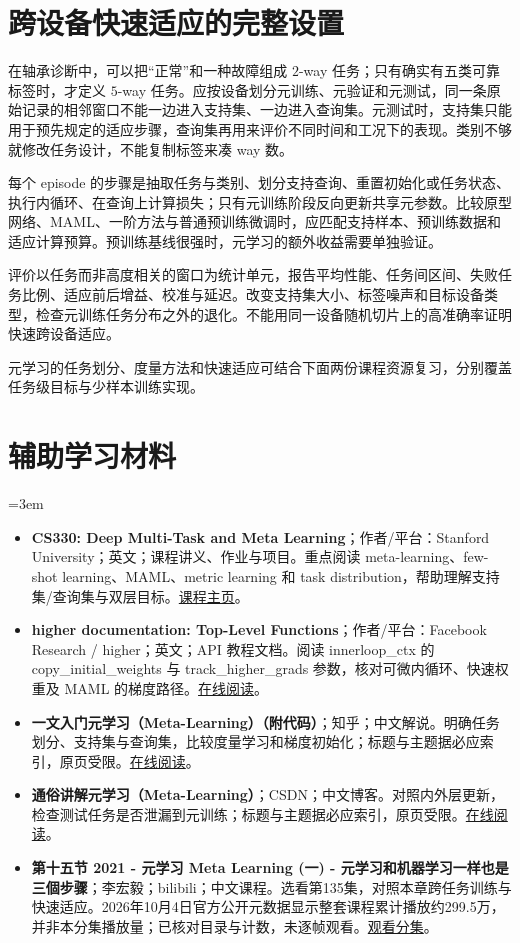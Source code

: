 \section{跨设备快速适应的完整设置}
在轴承诊断中，可以把“正常”和一种故障组成 $2$-way 任务；只有确实有五类可靠标签时，才定义 $5$-way 任务。应按设备划分元训练、元验证和元测试，同一条原始记录的相邻窗口不能一边进入支持集、一边进入查询集。元测试时，支持集只能用于预先规定的适应步骤，查询集再用来评价不同时间和工况下的表现。类别不够就修改任务设计，不能复制标签来凑 way 数。

每个 episode 的步骤是抽取任务与类别、划分支持查询、重置初始化或任务状态、执行内循环、在查询上计算损失；只有元训练阶段反向更新共享元参数。比较原型网络、MAML、一阶方法与普通预训练微调时，应匹配支持样本、预训练数据和适应计算预算。预训练基线很强时，元学习的额外收益需要单独验证\cite{chen2019closer}。

评价以任务而非高度相关的窗口为统计单元，报告平均性能、任务间区间、失败任务比例、适应前后增益、校准与延迟。改变支持集大小、标签噪声和目标设备类型，检查元训练任务分布之外的退化。不能用同一设备随机切片上的高准确率证明快速跨设备适应。

元学习的任务划分、度量方法和快速适应可结合下面两份课程资源复习，分别覆盖任务级目标与少样本训练实现。
\section*{辅助学习材料}
\begingroup
\emergencystretch=3em
\begin{itemize}
\item \textbf{CS330: Deep Multi-Task and Meta Learning}；作者/平台：Stanford University；英文；课程讲义、作业与项目。重点阅读 meta-learning、few-shot learning、MAML、metric learning 和 task distribution，帮助理解支持集/查询集与双层目标。\href{https://web.stanford.edu/class/cs330/}{课程主页}。
\item \textbf{higher documentation: Top-Level Functions}；作者/平台：Facebook Research / higher；英文；API 教程文档。阅读 innerloop\_ctx 的 copy\_initial\_weights 与 track\_higher\_grads 参数，核对可微内循环、快速权重及 MAML 的梯度路径。\href{https://higher.readthedocs.io/en/latest/toplevel.html}{在线阅读}。
\item \textbf{一文入门元学习（Meta-Learning）（附代码）}；知乎；中文解说。明确任务划分、支持集与查询集，比较度量学习和梯度初始化；标题与主题据必应索引，原页受限。\href{https://zhuanlan.zhihu.com/p/136975128}{在线阅读}。
\item \textbf{通俗讲解元学习（Meta-Learning）}；CSDN；中文博客。对照内外层更新，检查测试任务是否泄漏到元训练；标题与主题据必应索引，原页受限。\href{https://blog.csdn.net/bruce\_\_ray/article/details/131144371}{在线阅读}。
\item \textbf{第十五节 2021 - 元学习 Meta Learning (一) - 元学习和机器学习一样也是三個步骤}；李宏毅；bilibili；中文课程。选看第135集，对照本章跨任务训练与快速适应。2026年10月4日官方公开元数据显示整套课程累计播放约299.5万，并非本分集播放量；已核对目录与计数，未逐帧观看。\href{https://www.bilibili.com/video/BV1Wv411h7kN/?p=135}{观看分集}。
\end{itemize}
\endgroup
